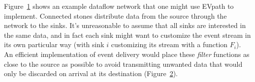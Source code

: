 \begin{figure}
  \label{fig:evpath-overlay}
\end{figure}

Figure~\ref{fig:evpath-overlay} shows an example dataflow network that one might use EVpath to
implement.  Connected stones distribute data from the source through the network to the sinks.  It's
unreasonable to assume that all sinks are interested in the same data, and in fact each sink might want
to customize the event stream in its own particular way (with sink $i$ customizing its stream with a
function $F_i$).  An efficient implementation of event delivery would place these \emph{filter} functions
as close to the source as possible to avoid transmitting unwanted data that would only be discarded on
arrival at its destination (Figure~\ref{fig:evpath-func1}).

\begin{figure}
    \label{fig:evpath-func1}
\end{figure}

